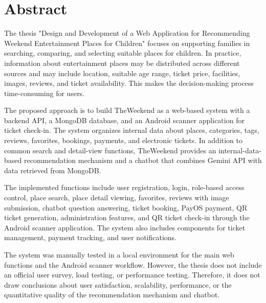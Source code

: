 \documentclass[../DoAn.tex]{subfiles}
\begin{document}
\chapter*{Abstract}

The thesis "Design and Development of a Web Application for Recommending Weekend Entertainment Places for Children" focuses on supporting families in searching, comparing, and selecting suitable places for children. In practice, information about entertainment places may be distributed across different sources and may include location, suitable age range, ticket price, facilities, images, reviews, and ticket availability. This makes the decision-making process time-consuming for users.

The proposed approach is to build TheWeekend as a web-based system with a backend API, a MongoDB database, and an Android scanner application for ticket check-in. The system organizes internal data about places, categories, tags, reviews, favorites, bookings, payments, and electronic tickets. In addition to common search and detail-view functions, TheWeekend provides an internal-data-based recommendation mechanism and a chatbot that combines Gemini API with data retrieved from MongoDB.

The implemented functions include user registration, login, role-based access control, place search, place detail viewing, favorites, reviews with image submission, chatbot question answering, ticket booking, PayOS payment, QR ticket generation, administration features, and QR ticket check-in through the Android scanner application. The system also includes components for ticket management, payment tracking, and user notifications.

The system was manually tested in a local environment for the main web functions and the Android scanner workflow. However, the thesis does not include an official user survey, load testing, or performance testing. Therefore, it does not draw conclusions about user satisfaction, scalability, performance, or the quantitative quality of the recommendation mechanism and chatbot.
\end{document}
